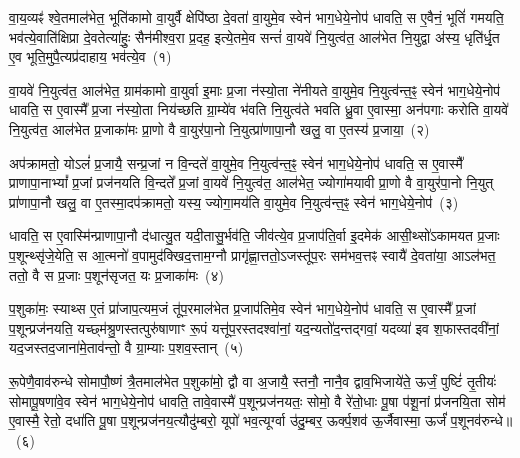 \label{sec:startkanda2}
\setcounter{anuvakam}{0}
वा॒य॒व्यꣴ॑ श्वे॒तमा\-ल॑भेत॒ भूति॑कामो वा॒युर्वै क्षेपि॑ष्ठा दे॒वता॑ वा॒युमे॒व स्वेन॑ भाग॒\-धेये॒नोप॑ धावति॒ स ए॒वैनं॒ भूतिं॑ गमयति॒ भव॑त्ये॒वाति॑क्षिप्रा दे॒वतेत्या॑हुः॒ सैन॑मीश्व॒रा प्र॒दह॒ इत्ये॒तमे॒व सन्तं॑ वा॒यवे॑ नि॒युत्व॑त॒ आल॑भेत नि॒युद्वा अ॑स्य॒ धृति॑र्धृ॒त ए॒व भूति॒मुपै॒त्यप्र॑दाहाय॒ भव॑त्ये॒व~(१)\ip

वा॒यवे॑ नि॒युत्व॑त॒ आ\-ल॑भेत॒ ग्राम॑कामो वा॒युर्वा इ॒माः प्र॒जा न॑स्यो॒ता ने॑नीयते वा॒युमे॒व नि॒युत्व॑न्त॒ꣴ॒ स्वेन॑ भाग॒\-धेये॒नोप॑ धावति॒ स ए॒वास्मै᳚ प्र॒जा न॑स्यो॒ता निय॑च्छति ग्रा॒म्ये॑व भ॑वति नि॒युत्व॑ते भवति ध्रु॒वा ए॒वास्मा॒ अन॑पगाः करोति वा॒यवे॑ नि॒युत्व॑त॒ आल॑भेत प्र॒जाका॑मः प्रा॒णो वै वा॒युर॑पा॒नो नि॒युत्प्रा॑णापा॒नौ खलु॒ वा ए॒तस्य॑ प्र॒जाया॒~(२)\ip

अप॑क्रामतो॒ यो\-ऽलं॑ प्र॒जायै॒ सन्प्र॒जां न वि॒न्दते॑ वा॒युमे॒व नि॒युत्व॑न्त॒ꣴ॒ स्वेन॑ भाग॒\-धेये॒नोप॑ धावति॒ स ए॒वास्मै᳚ प्राणापा॒ना\-भ्यां᳚ प्र॒जां प्रज॑नयति वि॒न्दते᳚ प्र॒जां वा॒यवे॑ नि॒युत्व॑त॒ आ\-ल॑भेत॒ ज्योगा॑मयावी प्रा॒णो वै वा॒युर॑पा॒नो नि॒युत् प्रा॑णापा॒नौ खलु॒ वा ए॒तस्मा॒दप॑क्रामतो॒ यस्य॒ ज्योगा॒मय॑ति वा॒युमे॒व नि॒युत्व॑न्त॒ꣴ॒ स्वेन॑ भाग॒\-धेये॒नोप॑~(३)\ip

धावति॒ स ए॒वास्मि॑न्प्राणापा॒नौ द॑धात्यु॒त यदी॒तासु॒र्भव॑ति॒ जीव॑त्ये॒व प्र॒जा\-प॑ति॒र्वा इ॒दमेक॑ आसी॒थ्सो॑\-ऽकामयत प्र॒जाः प॒शून्थ्सृ॑जे॒येति॒ स आ॒त्मनो॑ व॒पामुद॑क्खिद॒त्ताम॒ग्नौ प्रागृ॑ह्णा॒त्ततो॒\-ऽजस्तू॑प॒रः सम॑भव॒त्तꣴ स्वायै॑ दे॒वता॑या॒ आ\-ऽल॑भत॒ ततो॒ वै स प्र॒जाः प॒शून॑सृजत॒ यः प्र॒जाका॑मः~(४)\ip

प॒शुका॑मः॒ स्याथ्स ए॒तं प्रा॑जाप॒त्यम॒जं तू॑प॒रमाल॑भेत प्र॒जा\-प॑तिमे॒व स्वेन॑ भाग॒\-धेये॒नोप॑ धावति॒ स ए॒वास्मै᳚ प्र॒जां प॒शून्प्रज॑नयति॒ यच्छ्म॑श्रु॒णस्तत्पुरु॑षाणाꣳ रू॒पं यत्तू॑प॒रस्तदश्वा॑नां॒ यद॒न्यतो॑द॒न्तद्गवां॒ यदव्या॑ इव श॒फास्तदवी॑नां॒ यद॒ज\-स्तद॒जाना॑मे॒ताव॑न्तो॒ वै ग्रा॒म्याः प॒शव॒स्तान्~(५)\ip

रू॒पेणै॒वाव॑\-रुन्धे सोमापौ॒ष्णं त्रै॒तमाल॑भेत प॒शुका॑मो॒ द्वौ वा अ॒जायै॒ स्तनौ॒ नानै॒व द्वाव॒भिजाये॑ते॒ ऊर्जं॒ पुष्टिं॑ तृ॒तीयः॑ सोमापू॒षणा॑वे॒व स्वेन॑ भाग॒\-धेये॒नोप॑ धावति॒ तावे॒वास्मै॑ प॒शून्प्रज॑नयतः॒ सोमो॒ वै रे॑तो॒धाः पू॒षा प॑शू॒नां प्र॑जनयि॒ता सोम॑ ए॒वास्मै॒ रेतो॒ दधा॑ति पू॒षा प॒शून्प्रज॑नय॒त्यौदु॑म्बरो॒ यूपो॑ भव॒त्यूर्ग्वा उ॑दु॒म्बर॒ ऊर्क्प॒शव॑ ऊ॒र्जैवास्मा॒ ऊर्जं॑ प॒शूनव॑\-रुन्धे॥~(६)\ip

{\anuvakamend[{भव॑त्ये॒व प्र॒जाया॑ आ॒मय॑ति वा॒युमे॒व नि॒युत्व॑न्त॒ꣴ॒ स्वेन॑ भाग॒\-धेये॒नोप॑ प्र॒जाका॑म॒स्तान् यूप॒स्त्रयो॑दश च।}]}

